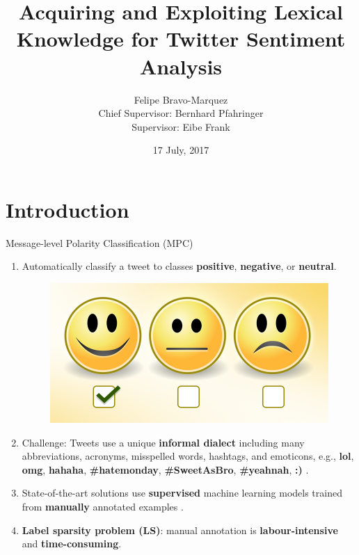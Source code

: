 \documentclass[handout]{beamer}
\title{Acquiring and Exploiting Lexical Knowledge for Twitter Sentiment Analysis}
\author[Felipe Bravo Márquez]{\footnotesize
 \textcolor[rgb]{0.00,0.00,1.00}{Felipe Bravo-Marquez} \\ Chief Supervisor: Bernhard Pfahringer \\  Supervisor: Eibe Frank}
\institute{Department of Computer Science, University of Waikato }
\date{17 July, 2017}
\begin{document}
\begin{frame}
\titlepage


\end{frame}

\section{Introduction}


\begin{frame}{Message-level Polarity Classification (MPC)}
\begin{scriptsize}
  \begin{enumerate}
   \item Automatically classify a tweet to classes \textcolor[rgb]{0.00,0.00,1.00}{\textbf{positive}}, \textcolor[rgb]{1.00,0.00,0.00}{\textbf{negative}}, or \textcolor[rgb]{0.00,1.00,0.00}{\textbf{neutral}}. 
   
     \begin{figure}[h]
        	\includegraphics[scale = 0.15]{pics/sent.png}
        \end{figure}
   \item Challenge: Tweets use a unique \textbf{informal dialect} including many abbreviations, acronyms, misspelled words, hashtags, and emoticons, e.g., \textbf{lol}, \textbf{omg}, \textbf{hahaha}, \textbf{\#hatemonday}, \textbf{\#SweetAsBro}, \textbf{\#yeahnah}, \textbf{:)} .
   \item State-of-the-art solutions use \textbf{supervised} machine learning models trained from \textbf{manually} annotated examples \cite{NRCJAIR14}.
   \item \textbf{Label sparsity problem (LS)}: manual annotation is \textbf{labour-intensive} and \textbf{time-consuming}. 
  \end{enumerate} 
\end{scriptsize}

\end{frame}
\end{document}
